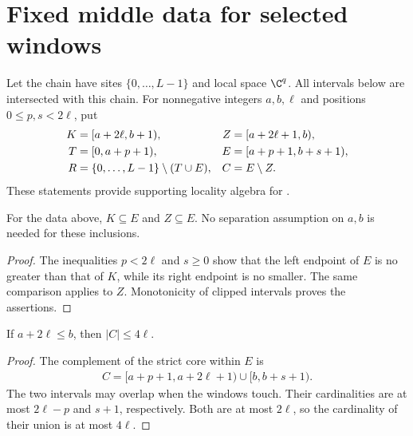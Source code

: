 \section{Fixed middle data for selected windows}

Let the chain have sites $\{0,\ldots,L-1\}$ and local space $\C^q$.
All intervals below are intersected with this chain. For nonnegative
integers $a,b,\ell$ and positions $0\le p,s<2\ell$, put
\begin{align}
    K & =[a+2\ell,b+1),                      & Z &
    =[a+2\ell+1,b),\notag                                         \\
    T & =[0,a+p+1),                          & E &
    =[a+p+1,b+s+1),\notag                                         \\
    R & =\{0,\ldots,L-1\}\setminus(T\cup E), & C & =E\setminus Z.
    \label{eq:selected_middle_regions}
\end{align}
These statements provide supporting locality algebra for
\cite[Proposition~5.7]{Arad2016RigorousRG}.

\begin{lemma}
    \label{thm:selected_middle_core_inclusions}
    \leanok
    For the data above, $K\subseteq E$ and $Z\subseteq E$.
    No separation assumption on $a,b$ is needed for these inclusions.
\end{lemma}
\begin{proof}\leanok
    The inequalities $p<2\ell$ and $s\ge0$ show that the left endpoint of
    $E$ is no greater than that of $K$, while its right endpoint is no
    smaller. The same comparison applies to $Z$. Monotonicity of clipped
    intervals proves the assertions.
\end{proof}

\begin{lemma}
    \label{thm:selected_middle_collar_cardinality}
    \leanok
    If $a+2\ell\le b$, then $|C|\le4\ell$.
\end{lemma}
\begin{proof}\leanok
    The complement of the strict core within $E$ is
    \begin{align}
        C=[a+p+1,a+2\ell+1)\cup
        [b,b+s+1).
        \label{eq:selected_middle_collar_union}
    \end{align}
    The two intervals may overlap when the windows touch. Their cardinalities
    are at most $2\ell-p$ and $s+1$, respectively. Both are at most $2\ell$,
    so the cardinality of their union is at most $4\ell$.
\end{proof}

